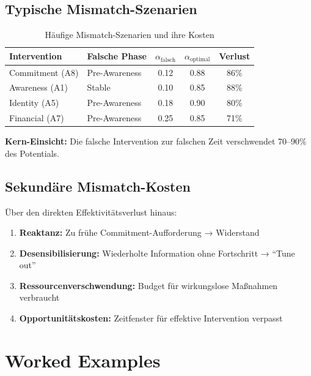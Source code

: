 \subsection{Typische Mismatch-Szenarien}

\begin{table}[htbp]
\centering
\caption{Häufige Mismatch-Szenarien und ihre Kosten}
\label{tab:18-mismatch-scenarios}
\renewcommand{\arraystretch}{1.3}
\small
\begin{tabular}{@{}llccc@{}}
\toprule
\textbf{Intervention} & \textbf{Falsche Phase} & \textbf{$\alpha_{\text{falsch}}$} & \textbf{$\alpha_{\text{optimal}}$} & \textbf{Verlust} \\
\midrule
Commitment (A8) & Pre-Awareness & 0.12 & 0.88 & 86\% \\
Awareness (A1) & Stable & 0.10 & 0.85 & 88\% \\
Identity (A5) & Pre-Awareness & 0.18 & 0.90 & 80\% \\
Financial (A7) & Pre-Awareness & 0.25 & 0.85 & 71\% \\
\bottomrule
\end{tabular}
\end{table}

\textbf{Kern-Einsicht:} Die falsche Intervention zur falschen Zeit verschwendet 70--90\% des Potentials.

\subsection{Sekundäre Mismatch-Kosten}

Über den direkten Effektivitätsverlust hinaus:
\begin{enumerate}
\item \textbf{Reaktanz:} Zu frühe Commitment-Aufforderung → Widerstand
\item \textbf{Desensibilisierung:} Wiederholte Information ohne Fortschritt → ``Tune out''
\item \textbf{Ressourcenverschwendung:} Budget für wirkungslose Maßnahmen verbraucht
\item \textbf{Opportunitätskosten:} Zeitfenster für effektive Intervention verpasst
\end{enumerate}


\section{Worked Examples}
\label{sec:18-examples}

